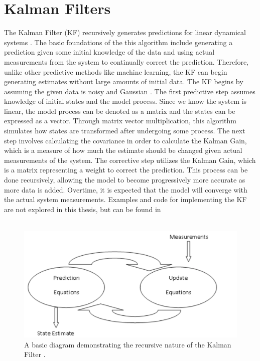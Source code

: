 \chapter{Kalman Filters}
\label{Kalman Filters}


The Kalman Filter (KF) recursively generates predictions for linear dynamical systems \cite{inbook}. The basic foundations of the this algorithm include generating a prediction given some initial knowledge of the data and using actual measurements from the system to continually correct the prediction. Therefore, unlike other predictive methods like machine learning, the KF can begin generating estimates without large amounts of initial data. The KF begins by assuming the given data is noisy and Gaussian \cite{inproceedings, article7}. The first predictive step assumes knowledge of initial states and the model process. Since we know the system is linear, the model process can be denoted as a matrix and the states can be expressed as a vector. Through matrix vector multiplication, this algorithm simulates how states are transformed after undergoing some process. The next step involves calculating the covariance in order to calculate the Kalman Gain, which is a measure of how much the estimate should be changed given actual measurements of the system. The corrective step utilizes the Kalman Gain, which is a matrix representing a weight to correct the prediction. This process can be done recursively, allowing the model to become progressively more accurate as more data is added. Overtime, it is expected that the model will converge with the actual system measurements. Examples and code for implementing the KF are not explored in this thesis, but can be found in \cite{article7}
\\  \\

\begin{figure}[h]
    \centering
    \includegraphics[scale = 0.3]{diagram.png}
    \caption{A basic diagram demonstrating the recursive nature of the Kalman Filter \cite{kohanbash_2014}.}
\end{figure}
\newpage



